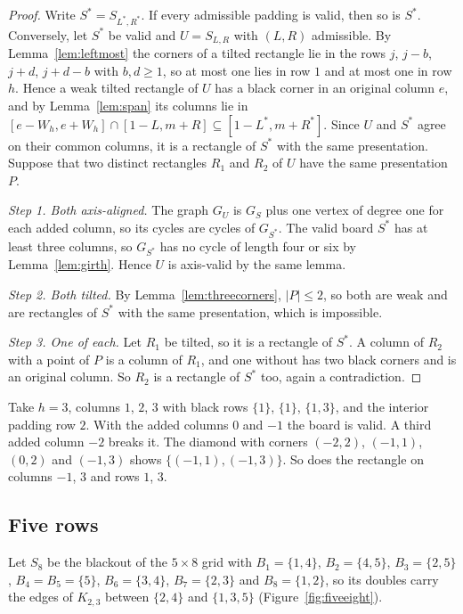 \begin{proof}
Write $S^*=S_{L^*,R^*}$. If every admissible padding is valid, then so is $S^*$.
Conversely, let $S^*$ be valid and
$U=S_{L,R}$ with $(L,R)$ admissible. By Lemma~\ref{lem:leftmost} the corners of a tilted
rectangle lie in the rows $j$, $j-b$, $j+d$, $j+d-b$ with $b,d\ge1$, so at most one lies in
row $1$ and at most one in row $h$. Hence a weak tilted rectangle of $U$ has a black corner in an
original column $e$, and by Lemma~\ref{lem:span} its columns lie in
$[e-W_h,e+W_h]\cap[1-L,m+R]\subseteq[1-L^*,m+R^*]$. Since $U$ and $S^*$ agree on their common
columns, it is a rectangle of $S^*$ with the same presentation. Suppose that two distinct
rectangles $R_1$ and $R_2$ of $U$ have the same presentation $P$.

\emph{Step 1. Both axis-aligned.} The graph $G_U$ is $G_S$ plus one vertex of degree one for
each added column, so its cycles are cycles of $G_{S^*}$. The valid board $S^*$ has at least
three columns, so $G_{S^*}$ has no cycle of length four or six by Lemma~\ref{lem:girth}. Hence
$U$ is axis-valid by the same lemma.

\emph{Step 2. Both tilted.} By Lemma~\ref{lem:threecorners}, $|P|\le2$, so both are weak and
are rectangles of $S^*$ with the same presentation, which is impossible.

\emph{Step 3. One of each.} Let $R_1$ be tilted, so it is a rectangle of $S^*$. A column of
$R_2$ with a point of $P$ is a column of $R_1$, and one without has two black corners and is
an original column. So $R_2$ is a rectangle of $S^*$ too, again a contradiction.
\end{proof}

\begin{remark}\label{rem:interior}
Take $h=3$, columns $1$, $2$, $3$ with black rows $\{1\}$, $\{1\}$, $\{1,3\}$, and the
interior padding row $2$. With the added columns $0$ and $-1$ the board is valid. A third
added column $-2$ breaks it. The diamond with corners $(-2,2)$, $(-1,1)$, $(0,2)$ and
$(-1,3)$ shows $\{(-1,1),(-1,3)\}$. So does the rectangle on columns $-1$, $3$ and rows $1$,
$3$.
\end{remark}

\subsection{Five rows}

Let $S_8$ be the blackout of the $5\times8$ grid with $B_1=\{1,4\}$, $B_2=\{4,5\}$,
$B_3=\{2,5\}$, $B_4=B_5=\{5\}$, $B_6=\{3,4\}$, $B_7=\{2,3\}$ and $B_8=\{1,2\}$, so its
doubles carry the edges of $K_{2,3}$ between $\{2,4\}$ and $\{1,3,5\}$
(Figure~\ref{fig:fiveeight}).

